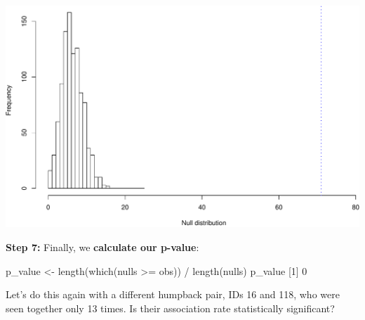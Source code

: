 \documentclass[
]{book}
\newenvironment{Shaded}{\begin{snugshade}}{\end{snugshade}}
\newcommand{\DecValTok}[1]{\textcolor[rgb]{0.00,0.00,0.81}{#1}}
\newcommand{\FunctionTok}[1]{\textcolor[rgb]{0.00,0.00,0.00}{#1}}
\newcommand{\NormalTok}[1]{#1}
\newcommand{\OtherTok}[1]{\textcolor[rgb]{0.56,0.35,0.01}{#1}}
\newcommand{\SpecialCharTok}[1]{\textcolor[rgb]{0.00,0.00,0.00}{#1}}
\begin{document}
\includegraphics{figures/unnamed-chunk-387-1.pdf}

\textbf{Step 7:} Finally, we \textbf{calculate our p-value}:

\begin{Shaded}
\begin{Highlighting}[]
\NormalTok{p\_value }\OtherTok{\textless{}{-}} \FunctionTok{length}\NormalTok{(}\FunctionTok{which}\NormalTok{(nulls }\SpecialCharTok{\textgreater{}=}\NormalTok{ obs)) }\SpecialCharTok{/} \FunctionTok{length}\NormalTok{(nulls)}
\NormalTok{p\_value}
\NormalTok{[}\DecValTok{1}\NormalTok{] }\DecValTok{0}
\end{Highlighting}
\end{Shaded}

Let's do this again with a different humpback pair, IDs 16 and 118, who were seen together only 13 times. Is their association rate statistically significant?
\end{document}
